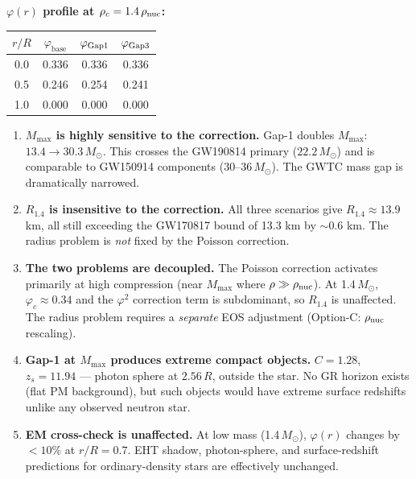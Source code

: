 \documentclass[10pt,twocolumn]{article}
\begin{document}
\noindent\textbf{$\varphi(r)$ profile at $\rho_c = 1.4\,\rho_{\rm nuc}$:}

\begin{center}
\begin{tabular}{cccc}
\hline
$r/R$ & $\varphi_\mathrm{base}$ & $\varphi_{\rm Gap1}$ & $\varphi_{\rm Gap3}$ \\
\hline
0.0 & 0.336 & 0.336 & 0.336 \\
0.5 & 0.246 & 0.254 & 0.241 \\
1.0 & 0.000 & 0.000 & 0.000 \\
\hline
\end{tabular}
\end{center}

\begin{tcolorbox}[colback=blue!5,colframe=blue!60,title=Option-A: Key Findings]
\begin{enumerate}
  \item \textbf{$M_\mathrm{max}$ is highly sensitive to the correction.}
    Gap-1 doubles $M_\mathrm{max}$: $13.4 \to 30.3\,M_\odot$.
    This crosses the GW190814 primary ($22.2\,M_\odot$) and is comparable to
    GW150914 components ($30$--$36\,M_\odot$). The GWTC mass gap is
    dramatically narrowed.
  \item \textbf{$R_{1.4}$ is insensitive to the correction.}
    All three scenarios give $R_{1.4} \approx 13.9$ km, all still exceeding the
    GW170817 bound of 13.3 km by $\sim 0.6$ km.  The radius problem is
    \emph{not} fixed by the Poisson correction.
  \item \textbf{The two problems are decoupled.}
    The Poisson correction activates primarily at high compression (near
    $M_\mathrm{max}$ where $\rho \gg \rho_{\rm nuc}$).  At 1.4\,$M_\odot$,
    $\varphi_c \approx 0.34$ and the $\varphi^2$ correction term is subdominant,
    so $R_{1.4}$ is unaffected.  The radius problem requires a \emph{separate}
    EOS adjustment (Option-C: $\rho_{\rm nuc}$ rescaling).
  \item \textbf{Gap-1 at $M_\mathrm{max}$ produces extreme compact objects.}
    $C = 1.28$, $z_s = 11.94$ --- photon sphere at $2.56\,R$, outside the star.
    No GR horizon exists (flat PM background), but such objects would have
    extreme surface redshifts unlike any observed neutron star.
  \item \textbf{EM cross-check is unaffected.}
    At low mass (1.4\,$M_\odot$), $\varphi(r)$ changes by $< 10\%$ at
    $r/R = 0.7$.  EHT shadow, photon-sphere, and surface-redshift predictions
    for ordinary-density stars are effectively unchanged.
\end{enumerate}
\end{tcolorbox}
\end{document}
